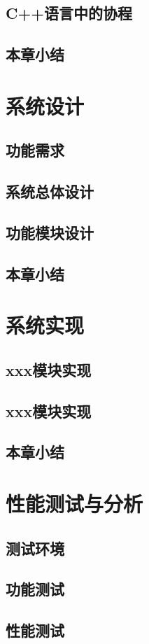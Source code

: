 \documentclass[supercite]{HustGraduPaper}
\theoremstyle{definition}
\begin{document}
\subsection{C++语言中的协程}
\subsection{本章小结}
\section{系统设计}
\subsection{功能需求}
\subsection{系统总体设计}
\subsection{功能模块设计}
\subsection{本章小结}
\section{系统实现}
\subsection{xxx模块实现}
\subsection{xxx模块实现}
\subsection{本章小结}
\section{性能测试与分析}
\subsection{测试环境}
\subsection{功能测试}
\subsection{性能测试}
\end{document}
